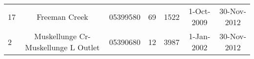 \begin{table}[h]
\begin{tabular}{l c ccccc}
17	&	Freeman Creek                          & 05399580                    & 69                                      & 1522                              & 1-Oct-2009                     & 30-Nov-2012                  \\
2	&	Muskellunge Cr-Muskellunge L Outlet    & 05390680                    & 12                                      & 3987                              & 1-Jan-2002                     & 30-Nov-2012 \\
\hline                  
\end{tabular}
\label{tab:streamflow_calibration_sites}
\end{table}